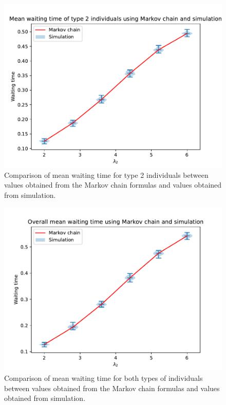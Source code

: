 \begin{figure}[H]
    \centering
    \includegraphics[width=.8\textwidth]{imgs/waiting_time_comparison/waiting_2.pdf}
    \caption{
        Comparison of mean waiting time for type 2 individuals between values 
        obtained from the Markov chain formulas and values obtained from 
        simulation.
    }
    \label{fig:markov_vs_des_waiting_time_comparison_2}
\end{figure}

\begin{figure}[H]
    \centering
    \includegraphics[width=.8\textwidth]{imgs/waiting_time_comparison/waiting_overall.pdf}
    \caption{
        Comparison of mean waiting time for both types of individuals between 
        values obtained from the Markov chain formulas and values obtained from 
        simulation.
    }
    \label{fig:markov_vs_des_waiting_time_comparison_overall}
\end{figure}


